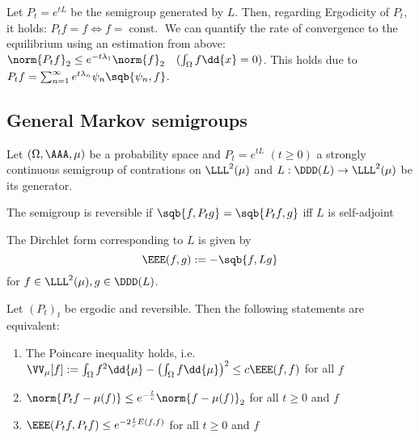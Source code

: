 \begin{exm}
    Let $P_t = e^{tL}$ be the semigroup generated by $L$.
    Then, regarding Ergodicity of $P_t$, it holds: \quad $P_tf=f \iff f = \operatorname{const.} $ We can quantify the rate of convergence to the equilibrium using an estimation from above: \quad $\norm{P_tf}_2 \leq e^{-t\lambda_1}\norm{f}_2 \quad (\int_\Omega f \dd{x}=0)$. This holds due to $P_t f = \sum_{n=1}^\infty e^{t\lambda_n} \psi_n \sqb{\psi_n,f}$.
    
\end{exm}


\subsection{General Markov semigroups}

\begin{defn}[Semigroup]

\end{defn}


Let $(\Omega,\AAA, \mu)$ be a probability space and $P_t = e^{tL}$ $(t\geq0)$ a strongly continuous semigroup of contrations on $\LLL^2(\mu)$ and $L:\DDD(L)\to \LLL^2(\mu)$ be its generator.


\begin{defn}[Reversibility]

\end{defn}


\begin{thm}[Reversibility]
The semigroup is reversible if $\sqb{f,P_t g} = \sqb{P_tf,g}$ iff $L$ is self-adjoint
\end{thm}


The Dirchlet form corresponding to $L$ is given by $$\EEE(f,g):= -\sqb{f,Lg}$$
for $f\in \LLL^2(\mu),g\in \DDD(L)$.


\begin{thm}
    Let $(P_t)_t$ be ergodic and reversible. Then the following statements are equivalent:
    \begin{enumerate}
        \item The Poincare inequality holds, i.e. $\VV_\mu[f]:=\int_\Omega f^2 \dd{\mu}- \left(\int_\Omega f \dd{\mu}\right)^2 \leq c \EEE(f,f)$ for all $f$
        \item $\norm{P_t f - \mu(f)}\leq e^{-\frac{t}{c}}\norm{f-\mu(f)}_2$ for all $t\geq 0$ and $f$
        \item $\EEE(P_tf,P_tf) \leq e^{-2\frac{t}{c}E(f,f)}$ for all $t\geq 0$ and $f$
    \end{enumerate}
\end{thm}


